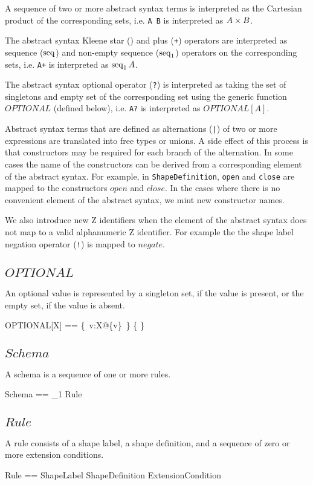 \documentclass{article}
\begin{document}
A sequence of two or more abstract syntax terms is interpreted as the Cartesian product of the corresponding sets, i.e.
{\tt A B} is interpreted as $A \times B$.

The abstract syntax Kleene star ({\tt *}) and plus ({\tt +}) operators are interpreted as sequence ($\mathop{\mathrm{seq}}$) 
and non-empty sequence ($\mathop{\mathrm{seq}}_1$) operators on the corresponding sets, i.e.
{\tt A+} is interpreted as $\mathop{\mathrm{seq}}_1 A$.

The abstract syntax optional operator ({\tt ?}) is interpreted as taking the set of singletons and empty set of the corresponding set
using the generic function $OPTIONAL$ (defined below), i.e.
{\tt A?} is interpreted as $OPTIONAL[A]$.

Abstract syntax terms that are defined as alternations ({\tt |}) of two or more expressions are translated into free types or unions.
A side effect of this process is that constructors may be required for each branch of the alternation.
In some cases the name of the constructors can be derived from a corresponding element of the abstract syntax.
For example, in {\tt ShapeDefinition}, {\tt open} and {\tt close} are mapped to the constructors $open$ and $close$.
In the cases where there is no convenient element of the abstract syntax, we mint new constructor names.

We also introduce new Z identifiers when the element of the abstract syntax does not map to a valid alphanumeric Z identifier.
For example the the shape label negation operator ({\tt !}) is mapped to $negate$.

\subsection{$OPTIONAL$}
An optional value is represented by a singleton set, if the value is present, or the empty set, if the value is absent.
\begin{zed}
	OPTIONAL[X] == \{~v:X@\{v\}~\} \cup \{ \emptyset \}
\end{zed}

\subsection{$Schema$}
A schema is a sequence of one or more rules.
\begin{zed}
	Schema == \seq_1 Rule
\end{zed}

\subsection{$Rule$}
A rule consists of a shape label, a shape definition, and a sequence of zero or more extension conditions.
\begin{zed}
	Rule == ShapeLabel \cross ShapeDefinition \cross \seq ExtensionCondition
\end{zed}
\end{document}
